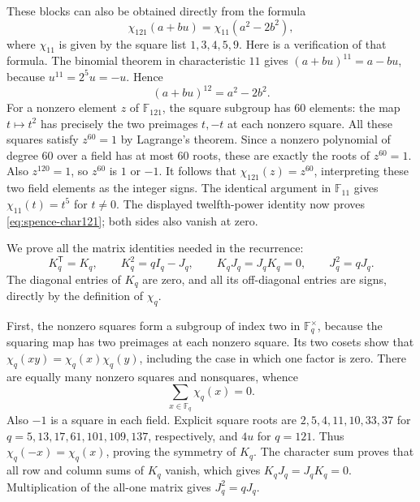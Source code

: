 \documentclass[10pt]{article}
\begin{document}
These blocks can also be obtained directly from the formula
\begin{equation}\label{eq:spence-char121}
 \chi_{121}(a+bu)=\chi_{11}(a^2-2b^2),
\end{equation}
where $\chi_{11}$ is given by the square list $1,3,4,5,9$.
Here is a verification of that formula. The binomial theorem in
characteristic $11$ gives $(a+bu)^{11}=a-bu$, because
$u^{11}=2^5u=-u$. Hence
\[
 (a+bu)^{12}=a^2-2b^2.
\]
For a nonzero element $z$ of $\mathbb F_{121}$, the square subgroup has
$60$ elements: the map $t\mapsto t^2$ has precisely the two preimages
$t,-t$ at each nonzero square. All these squares satisfy $z^{60}=1$ by
Lagrange's theorem. Since a nonzero polynomial of degree $60$ over a field
has at most $60$ roots, these are exactly the roots of $z^{60}=1$.
Also $z^{120}=1$, so $z^{60}$ is $1$ or $-1$. It follows that
$\chi_{121}(z)=z^{60}$, interpreting these two field elements as the
integer signs. The identical argument in $\mathbb F_{11}$ gives
$\chi_{11}(t)=t^5$ for $t\ne0$. The displayed twelfth-power identity now
proves \eqref{eq:spence-char121}; both sides also vanish at zero.

We prove all the matrix identities needed in the recurrence:
\begin{equation}\label{eq:spence-paley}
 K_q^{\mathsf T}=K_q,\qquad
 K_q^2=qI_q-J_q,\qquad
 K_qJ_q=J_qK_q=0,\qquad J_q^2=qJ_q.
\end{equation}
The diagonal entries of $K_q$ are zero, and all its off-diagonal entries
are signs, directly by the definition of $\chi_q$.

First, the nonzero squares form a subgroup of index two in
$\mathbb F_q^\times$, because the squaring map has two preimages at each
nonzero square. Its two cosets show that $\chi_q(xy)=\chi_q(x)\chi_q(y)$,
including the case in which one factor is zero. There are equally many
nonzero squares and nonsquares, whence
\[
 \sum_{x\in\mathbb F_q}\chi_q(x)=0.
\]
Also $-1$ is a square in each field. Explicit square roots are
$2,5,4,11,10,33,37$ for $q=5,13,17,61,101,109,137$, respectively,
and $4u$ for $q=121$.
Thus $\chi_q(-x)=\chi_q(x)$, proving the symmetry of $K_q$. The character
sum proves that all row and column sums of $K_q$ vanish, which gives
$K_qJ_q=J_qK_q=0$. Multiplication of the all-one matrix gives
$J_q^2=qJ_q$.
\end{document}
